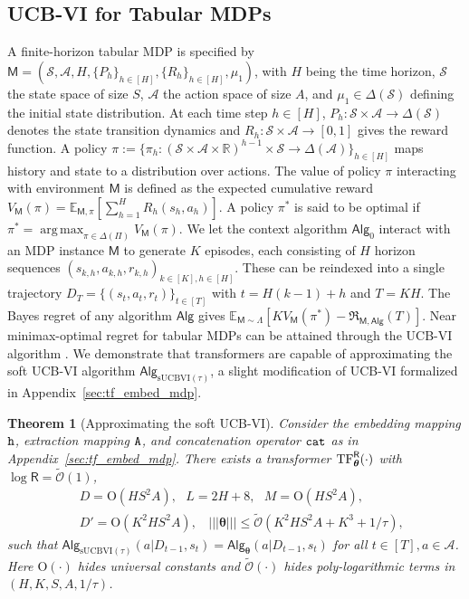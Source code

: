 \documentclass[10pt]{article}
\newtheorem{theorem}{Theorem}
\DeclareMathOperator*{\argmax}{arg\,max}
\newcommand{\<}{\left\langle}
\renewcommand{\>}{\right\rangle}
\newcommand{\TF}{{\rm TF}}
\newcommand{\nrmp}[1]{{\left|\!\left|\!\left|{#1}\right|\!\right|\!\right|}}
\newcommand{\E}{\mathbb{E}}
\newcommand{\R}{\mathbb{R}}
\newcommand{\inst}{{\mathsf{M}}}
\newcommand{\temp}{{\tau}}
\newcommand{\tcO}{{\tilde{\mathcal O}}}
\newcommand{\state}{{s}}
\newcommand{\action}{{a}}
\newcommand{\reward}{{r}}
\newcommand{\totlen}{{T}}
\newcommand{\cat}{{\tt cat}}
\newcommand{\extractmap}{{\tt A}}
\newcommand{\embedmap}{{\tt h}}
\newcommand{\sAlg}{{\mathsf{Alg}}}
\newcommand{\dset}{{D}}
\newcommand{\plc}{{\pi}}
\newcommand{\plcset}{{\Pi}}
\newcommand{\optplc}{{\pi^*}}
\newcommand{\prior}{{\Lambda}}
\newcommand{\Numepi}{{K}}
\newcommand{\horizon}{{H}}
\newcommand{\statesp}{{\mathcal{S}}}
\newcommand{\actionsp}{{\mathcal{A}}}
\renewcommand{\horizon}{{H}}
\newcommand{\transit}{{P}}
\newcommand{\rewardfun}{{R}}
\newcommand{\init}{{\mu_1}}
\newcommand{\valuefun}{{V}}
\newcommand{\tfpar}{{\btheta}}
\newcommand{\hidden}{{D'}}
\newcommand{\clipval}{{\mathsf{R}}}
\newcommand{\totreward}{{\mathfrak{R}}}
\newcommand{\Numst}{{S}}
\newcommand{\Numact}{{A}}
\newcommand{\Vfun}{{\valuefun}}
\newcommand{\sUCBVI}{{\mathrm{sUCBVI}}}
\newcommand{\conO}{{\mathrm{O}}}
\def\btheta{{\boldsymbol \theta}}
\begin{document}
\subsection{UCB-VI for Tabular MDPs}\label{sec:Tabular-MDP-statement}
A finite-horizon tabular MDP is specified by $\inst=(\statesp,\actionsp, \horizon, \{\transit_h\}_{h\in[\horizon]},\{\rewardfun_h\}_{h\in[\horizon]},\init)$, with $\horizon$ being the time horizon, $\statesp$ the state space of size $\Numst$, $\actionsp$ the action space of size $\Numact$, and $\init\in\Delta(\statesp)$ defining the initial state distribution. At each time step $h\in[\horizon]$, $\transit_h: \statesp\times\actionsp \to \Delta(\statesp)$ denotes the state transition dynamics and $\rewardfun_h:\statesp \times \actionsp \to [0,1]$ gives the reward function. A policy $\plc:=\{\plc_h:(\statesp \times\actionsp \times \R)^{h-1}\times\statesp \to\Delta(\actionsp)\}_{h \in [\horizon]}$ maps history and state to a distribution over actions. The value of policy $\pi$ interacting with environment $\inst$ is defined as the expected cumulative reward $\valuefun_\inst(\plc)=\E_{\inst,\plc}[\sum_{h=1}^\horizon \rewardfun_h (\state_h,\action_h)]$. A policy $\optplc$ is said to be optimal if $\optplc=\argmax_{\pi\in\Delta(\plcset)}\valuefun_\inst(\pi)$.
We let the context algorithm $\sAlg_0$ interact with an MDP instance $\inst$ to generate $\Numepi$ episodes, each consisting of $\horizon$ horizon sequences $ (\state_{k,h},\action_{k,h},\reward_{k,h})_{k \in [\Numepi], h \in [\horizon]}$. These can be reindexed into a single trajectory $\dset_{\totlen} = \{ (\state_t,\action_t,\reward_t) \}_{t \in [\totlen]}$ with $t=H(k-1)+h$ and $\totlen=\Numepi\horizon$. The Bayes regret of any algorithm $\sAlg$ gives $\E_{\inst\sim\prior}[\Numepi\Vfun_\inst(\plc^*)-\totreward_{\inst,\sAlg}(\totlen)]$.
Near minimax-optimal regret for tabular MDPs can be attained through the UCB-VI algorithm \citep{azar2017minimax}. We demonstrate that transformers are capable of approximating the soft UCB-VI algorithm $\sAlg_{\sUCBVI(\tau)}$, a slight modification of UCB-VI formalized in Appendix~\ref{sec:tf_embed_mdp}.
\begin{theorem}[Approximating the soft UCB-VI]\label{thm:approx_ucbvi}
Consider the embedding mapping $\embedmap$, extraction mapping $\extractmap$, and concatenation operator $\cat$ as in Appendix~\ref{sec:tf_embed_mdp}. There exists a transformer $\TF_\btheta^{\clipval}(\cdot)$ with $\log \clipval = \tcO(1)$,
\begin{equation}\label{eq:ucbvi_tf_param-main}
\begin{aligned}
&~D =\conO(\horizon\Numst^2\Numact),~~~L= 2\horizon+8,~~~M= \conO(\horizon\Numst^2\Numact),\\
&~\hidden= \conO(\Numepi^2\horizon\Numst^2\Numact),~~~~\nrmp{\btheta}\leq \tcO(\Numepi^2\horizon\Numst^2\Numact+\Numepi^3+1/\temp),
\end{aligned}
\end{equation}
such that
$\sAlg_{\sUCBVI(\tau)}(\action|\dset_{t-1},\state_t) = \sAlg_{\tfpar}(\action|\dset_{t-1},\state_t)$ for all $t\in[T],\action\in\actionsp$. Here $\conO(\cdot)$ hides universal constants and $\tcO(\cdot)$  hides poly-logarithmic terms in $(\horizon,\Numepi,\Numst,\Numact,1/\temp)$.
\end{theorem}
\end{document}

